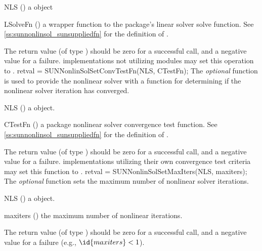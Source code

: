 {
  \begin{args}[LSolveFn]
  \item[NLS] ()
    a {\sunnonlinsol} object
  \item[LSolveFn] ()
    a wrapper function to the {\sundials} package's linear solver
    solve function. See \ref{ss:sunnonlinsol_sunsuppliedfn} for the
    definition of .
  \end{args}
}
{
  The return value  (of type ) should be zero for a
  successful call, and a negative value for a failure.
}
{
  {\sunnonlinsol} implementations not utilizing {\sunlinsol} modules
  may set this operation to .
}
{
  retval = SUNNonlinSolSetConvTestFn(NLS, CTestFn);
}
{
  The \textit{optional} function  is
  used to provide the nonlinear solver with a function for determining
  if the nonlinear solver iteration has converged.
}
{
  \begin{args}[CTestFn]
  \item[NLS] ()
    a {\sunnonlinsol} object.
  \item[CTestFn] ()
    a {\sundials} package nonlinear solver convergence test function.
    See \ref{ss:sunnonlinsol_sunsuppliedfn} for the definition of
    .
  \end{args}
}
{
  The return value  (of type ) should be zero for a
  successful call, and a negative value for a failure.
}
{
  {\sunnonlinsol} implementations utilizing their own convergence test
  criteria may set this function to .
}
{
  retval = SUNNonlinSolSetMaxIters(NLS, maxiters);
}
{
  The \textit{optional} function  sets the
  maximum number of nonlinear solver iterations.
}
{
  \begin{args}[maxiters]
  \item[NLS] ()
    a {\sunnonlinsol} object.
  \item[maxiters] ()
    the maximum number of nonlinear iterations.
  \end{args}
}
{
  The return value  (of type ) should be zero for a
  successful call, and a negative value for a failure
  (e.g., $\id{maxiters} < 1$).
}
{}


